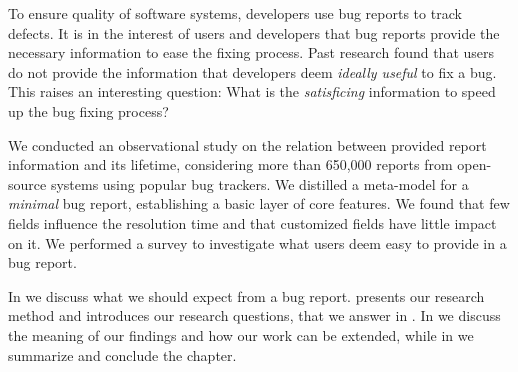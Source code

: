

%

%

\newcommand{\RQ}[2]{%
\refstepcounter{RQCounter} \label{#1}
 \begin{framed}
   \textbf{RQ\arabic{RQCounter}.}~#2
\end{framed}
}




To ensure quality of software systems, developers use bug reports to track defects.
It is in the interest of users and developers that bug reports provide the necessary information to ease the fixing process.
Past research found that users do not provide the information that developers deem \emph{ideally useful} to fix a bug.
This raises an interesting question: What is the \emph{satisficing} information to speed up the bug fixing process?

We conducted an observational study on the relation between provided report information and its lifetime, considering more than 650,000 reports from open-source systems using popular bug trackers.
We distilled a meta-model for a \emph{minimal} bug report, establishing a basic layer of core features.
We found that few fields influence the resolution time and that customized fields have little impact on it.
We performed a survey to investigate what users deem easy to provide in a bug report.

\structure
In  we discuss what we should expect from a bug report.
 presents our research method and introduces our research questions, that we answer in .
In  we discuss the meaning of our findings and how our work can be extended, while in  we summarize and conclude the chapter.

\newpage


